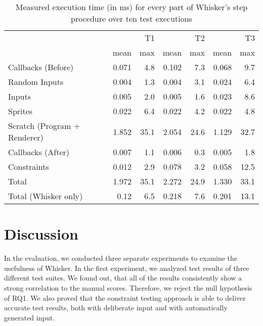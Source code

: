 \begin{table}[htpb]
    \centering
    \footnotesize
    \begin{tabular}{l|rr|rr|rr}
        \toprule
                                     &       & T1   &       & T2   &       & T3   \\
                                     & mean  & max  & mean  & max  & mean  & max  \\
        \midrule
        Callbacks (Before)           & 0.071 & 4.8  & 0.102 & 7.3  & 0.068 & 9.7  \\
        Random Inputs                & 0.004 & 1.3  & 0.004 & 3.1  & 0.024 & 6.4  \\
        Inputs                       & 0.005 & 2.0  & 0.005 & 1.6  & 0.023 & 8.6  \\
        Sprites                      & 0.022 & 6.4  & 0.022 & 4.2  & 0.022 & 4.8  \\
        Scratch (Program + Renderer) & 1.852 & 35.1 & 2.054 & 24.6 & 1.129 & 32.7 \\
        Callbacks (After)            & 0.007 & 1.1  & 0.006 & 0.3  & 0.005 & 1.8  \\
        Constraints                  & 0.012 & 2.9  & 0.078 & 3.2  & 0.058 & 12.5 \\
        \midrule
        Total                        & 1.972 & 35.1 & 2.272 & 24.9 & 1.330 & 33.1 \\
        Total (Whisker only)         & 0.12  & 6.5  & 0.218 & 7.6  & 0.201 & 13.1 \\
        \bottomrule
    \end{tabular}
    \caption{Measured execution time (in ms) for every part of Whisker's step procedure over ten test executions}
    \label{tab:time_measurements}
\end{table}

\section{Discussion}
\label{sec:discussion}

In the evaluation, we conducted three separate experiments to examine the usefulness of Whisker.
In the first experiment, we analyzed test results of three different test suites.
We found out, that all of the results consistently show a strong correlation to the manual scores.
Therefore, we reject the null hypothesis of RQ1.
We also proved that the constraint testing approach is able to deliver accurate test results,
both with deliberate input and with automatically generated input.
\parspace

